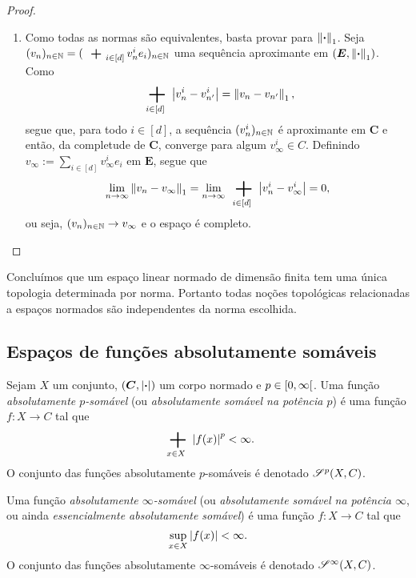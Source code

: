 \begin{proof}
\begin{enumerate}
	\item Como todas as normas são equivalentes, basta provar para $\left\Vert{\bm{\cdot}}\right\Vert_1$. Seja $(v_n)_{n \in \N} = (\sum_{i \in [d]} v_n^i e_i)_{n \in \N}$ uma sequência aproximante em $(\bm E,\left\Vert{\bm{\cdot}}\right\Vert_1)$. Como
		\begin{equation*}
		\sum_{i \in [d]} \abs{v_n^i - v_{n'}^i} = \nor{v_n - v_{n'}}_1,
		\end{equation*}
segue que, para todo $i \in [d]$, a sequência $(v_n^i)_{n \in \mathbb{N}}$ é aproximante em $\bm C$ e então, da completude de $\bm C$, converge para algum $v_\infty^i \in C$. Definindo $v_\infty := \sum_{i \in [d]} v_\infty^ie_i$ em $\bm E$, segue que
	\begin{equation*}
	\lim_{n \conv \infty} \nor{v_n - v_\infty}_1 = \lim_{n \conv \infty} \sum_{i \in [d]} \abs{v_n^i - v_\infty^i} = 0,
	\end{equation*}
ou seja, $(v_n)_{n \in \mathbb{N}} \rightarrow v_\infty$ e o espaço é completo.
	\end{enumerate}
\end{proof}

Concluímos que um espaço linear normado de dimensão finita tem uma única topologia determinada por norma.
Portanto todas noções topológicas relacionadas a espaços normados são independentes da norma escolhida.














\subsection{Espaços de funções absolutamente somáveis}

\begin{definition}
Sejam $X$ um conjunto, $(\bm C,\left\vert{\bm{\cdot}}\right\vert)$ um corpo normado
 e $p \in \left[0,\allowbreak \infty\right[$. Uma função \emph{absolutamente $p$-somável} (ou \emph{absolutamente somável na potência $p$}) é uma função $f\colon X \to C$ tal que
	\begin{equation*}
	\sum_{x \in X} \abs{f(x)}^p < \infty.
	\end{equation*}
O conjunto das funções absolutamente $p$-somáveis é denotado $\mathscr{S}^p(X,C)$.

Uma função \emph{absolutamente $\infty$-somável} (ou \emph{absolutamente somável na potência $\infty$}, ou ainda \emph{essencialmente absolutamente somável}) é uma função $f\colon X \to C$ tal que
	\begin{equation*}
	\sup_{x \in X} \left\vert{f(x)}\right\vert < \infty.
	\end{equation*}
O conjunto das funções absolutamente $\infty$-somáveis é denotado $\mathscr{S}^\infty(X,C)$.
\end{definition}

